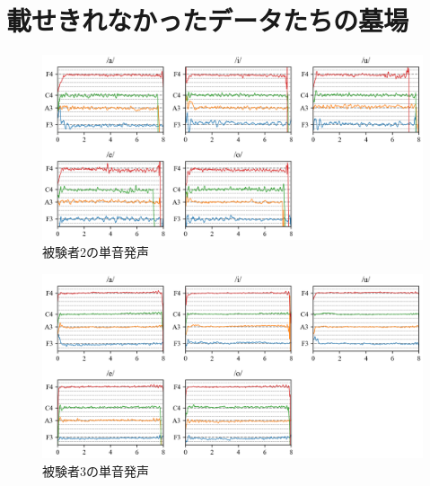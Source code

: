 \documentclass[10.5ptj,a4j,dvipdfmx,uplatex, oneside, openany]{jsbook}%
\begin{document}



\appendix
\chapter{載せきれなかったデータたちの墓場}

\begin{figure}[htbp]
    \begin{center}
      \includegraphics[clip,width=16.0cm]{F0_long_2.png}
      \caption{被験者2の単音発声}
      \label{fig:2}
    \end{center}
\end{figure}

\begin{figure}[htbp]
    \begin{center}
      \includegraphics[clip,width=16.0cm]{F0_long_3.png}
      \caption{被験者3の単音発声}
      \label{fig:3}
    \end{center}

\end{figure}
\end{document}
